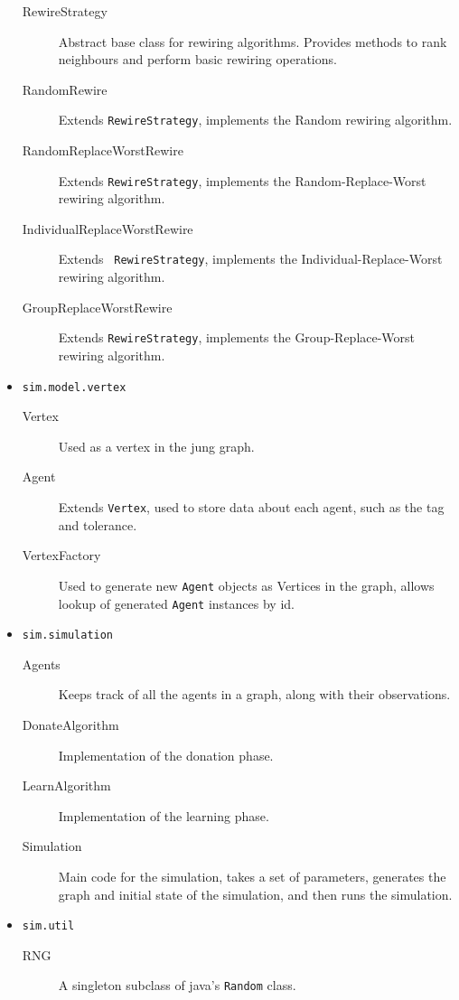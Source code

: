 \begin{itemize}
    \begin{description}
        \item[RewireStrategy] Abstract base class for rewiring
        algorithms. Provides methods to rank neighbours and perform
        basic rewiring operations.
        \item[RandomRewire] Extends {\tt RewireStrategy}, implements the
        Random rewiring algorithm.
        \item[RandomReplaceWorstRewire] Extends {\tt RewireStrategy},
        implements the \newline Random-Replace-Worst rewiring algorithm.
        \item[IndividualReplaceWorstRewire] Extends {\tt
        RewireStrategy}, implements the \newline Individual-Replace-Worst
        rewiring algorithm.
        \item[GroupReplaceWorstRewire] Extends {\tt RewireStrategy},
        implements the Group-Replace-Worst rewiring algorithm.
    \end{description}

    \item {\tt sim.model.vertex}

    \begin{description}
        \item[Vertex] Used as a vertex in the {\sc jung} graph.
        \item[Agent] Extends {\tt Vertex}, used to store data about each
        agent, such as the tag and tolerance.
        \item[VertexFactory] Used to generate new {\tt Agent} objects as
        Vertices in the graph, allows lookup of generated {\tt Agent}
        instances by id.
    \end{description}

    \item {\tt sim.simulation}

    \begin{description}
        \item[Agents] Keeps track of all the agents in a graph, along
        with their observations.
        \item[DonateAlgorithm] Implementation of the donation phase.
        \item[LearnAlgorithm] Implementation of the learning phase.
        \item[Simulation] Main code for the simulation, takes a set of
        parameters, generates the graph and initial state of the
        simulation, and then runs the simulation.
    \end{description}

    \item {\tt sim.util}

    \begin{description}
        \item[RNG] A singleton subclass of java's {\tt Random} class.
    \end{description}

\end{itemize}
